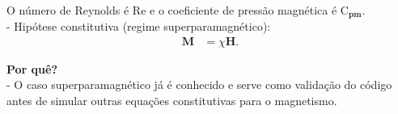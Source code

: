 \documentclass[portrait,a0paper,fontscale=0.42]{baposter} %
\begin{document}
\begin{poster}
{\paragraph{} O número de Reynolds é $\mathrm{Re}$ e o coeficiente de pressão magnética é $\mathrm{C}_{\mathbf{pm}}$.\\

- Hipótese constitutiva (regime superparamagnético): \begin{align}
	\mathbf{M} &= \chi \mathbf{H}.
\end{align}

\textbf{Por quê?}\\
 - O caso superparamagnético já é conhecido e serve como validação do código antes de simular outras equações constitutivas para o magnetismo.\\ %
}



\end{poster}
\end{document}
